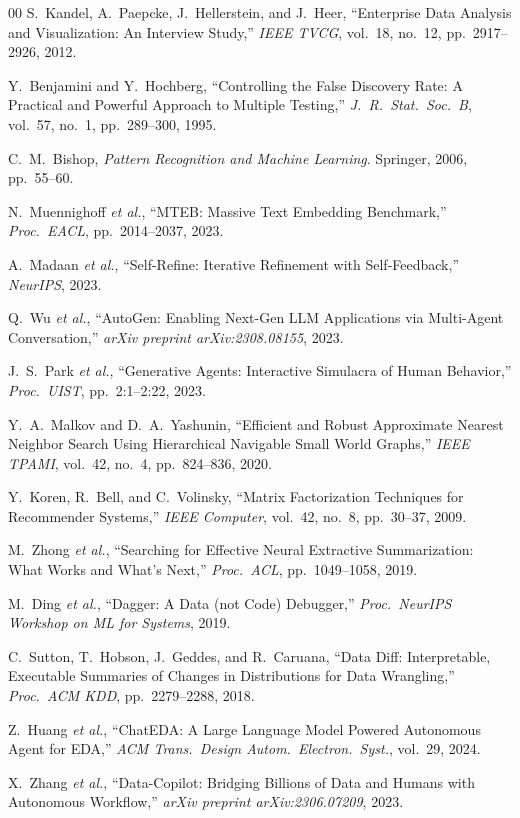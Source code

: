 \documentclass[conference]{IEEEtran}
\begin{document}
\begin{thebibliography}{00}
S.~Kandel, A.~Paepcke, J.~Hellerstein, and J.~Heer,
``Enterprise Data Analysis and Visualization: An Interview Study,''
\textit{IEEE TVCG}, vol.~18, no.~12, pp.\ 2917--2926, 2012.


Y.~Benjamini and Y.~Hochberg,
``Controlling the False Discovery Rate: A Practical and Powerful
Approach to Multiple Testing,''
\textit{J.\ R.\ Stat.\ Soc.\ B}, vol.~57, no.~1, pp.\ 289--300, 1995.

C.~M.~Bishop,
\textit{Pattern Recognition and Machine Learning}.
Springer, 2006, pp.\ 55--60.

N.~Muennighoff \textit{et al.},
``MTEB: Massive Text Embedding Benchmark,''
\textit{Proc.\ EACL}, pp.\ 2014--2037, 2023.

A.~Madaan \textit{et al.},
``Self-Refine: Iterative Refinement with Self-Feedback,''
\textit{NeurIPS}, 2023.

Q.~Wu \textit{et al.},
``AutoGen: Enabling Next-Gen LLM Applications via Multi-Agent Conversation,''
\textit{arXiv preprint arXiv:2308.08155}, 2023.

J.~S.~Park \textit{et al.},
``Generative Agents: Interactive Simulacra of Human Behavior,''
\textit{Proc.\ UIST}, pp.~2:1--2:22, 2023.

Y.~A.~Malkov and D.~A.~Yashunin,
``Efficient and Robust Approximate Nearest Neighbor Search Using
Hierarchical Navigable Small World Graphs,''
\textit{IEEE TPAMI}, vol.~42, no.~4, pp.\ 824--836, 2020.

Y.~Koren, R.~Bell, and C.~Volinsky,
``Matrix Factorization Techniques for Recommender Systems,''
\textit{IEEE Computer}, vol.~42, no.~8, pp.\ 30--37, 2009.

M.~Zhong \textit{et al.},
``Searching for Effective Neural Extractive Summarization:
What Works and What's Next,''
\textit{Proc.\ ACL}, pp.\ 1049--1058, 2019.

M.~Ding \textit{et al.},
``Dagger: A Data (not Code) Debugger,''
\textit{Proc.\ NeurIPS Workshop on ML for Systems}, 2019.

C.~Sutton, T.~Hobson, J.~Geddes, and R.~Caruana,
``Data Diff: Interpretable, Executable Summaries of Changes
in Distributions for Data Wrangling,''
\textit{Proc.\ ACM KDD}, pp.\ 2279--2288, 2018.

Z.~Huang \textit{et al.},
``ChatEDA: A Large Language Model Powered Autonomous Agent
for EDA,''
\textit{ACM Trans.\ Design Autom.\ Electron.\ Syst.}, vol.~29, 2024.

X.~Zhang \textit{et al.},
``Data-Copilot: Bridging Billions of Data and Humans with
Autonomous Workflow,''
\textit{arXiv preprint arXiv:2306.07209}, 2023.

\end{thebibliography}
\end{document}
